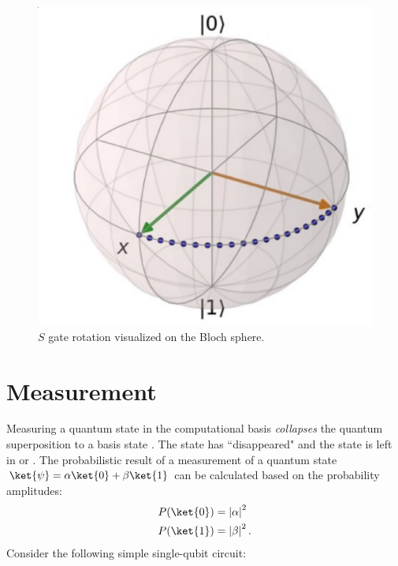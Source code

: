 \begin{figure}[ht]
  \centering
  \includegraphics[scale=0.21]{images/s_gate.eps}
  \vspace{1mm}
  \caption{$S$ gate rotation visualized on the Bloch sphere.}
  \label{fig:s_bloch}
\end{figure}

\section{Measurement}
Measuring a quantum state \ket{\psi} in the computational basis \emph{collapses} the quantum superposition to a basis state . The state \ket{\psi} has ``disappeared" and the state is left in  or . The probabilistic result of a measurement of a quantum state $\ket{\psi} = \alpha\ket{0} + \beta\ket{1}$ can be calculated based on the probability amplitudes:
\begin{align}
  P(\ket{0}) &= \left|\alpha\right|^2 \\
  P(\ket{1}) &= \left|\beta\right|^2.
\end{align}
Consider the following simple single-qubit circuit:

